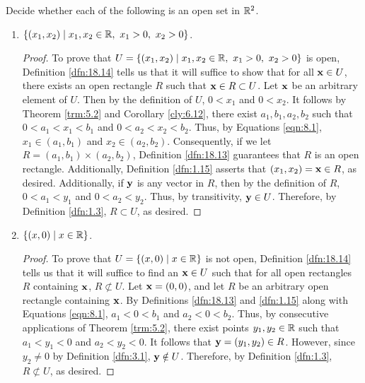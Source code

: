 \documentclass[../main.tex]{subfiles}
\begin{document}
\begin{exercise}\label{exr:18.15}
    Decide whether each of the following is an open set in $\mathbb{R}^2$.
    \begin{enumerate}[label={\textup{(}\alph*\textup{)}}]
        \item $\{(x_1,x_2)\mid x_1,x_2\in\R,\ x_1>0,\ x_2>0\}$.
        \begin{proof}
            To prove that $U=\{(x_1,x_2)\mid x_1,x_2\in\R,\ x_1>0,\ x_2>0\}$ is open, Definition \ref{dfn:18.14} tells us that it will suffice to show that for all $\mathbf{x}\in U$, there exists an open rectangle $R$ such that $\mathbf{x}\in R\subset U$. Let $\mathbf{x}$ be an arbitrary element of $U$. Then by the definition of $U$, $0<x_1$ and $0<x_2$. It follows by Theorem \ref{trm:5.2} and Corollary \ref{cly:6.12}, there exist $a_1,b_1,a_2,b_2$ such that $0<a_1<x_1<b_1$ and $0<a_2<x_2<b_2$. Thus, by Equations \ref{eqn:8.1}, $x_1\in(a_1,b_1)$ and $x_2\in(a_2,b_2)$. Consequently, if we let $R=(a_1,b_1)\times(a_2,b_2)$, Definition \ref{dfn:18.13} guarantees that $R$ is an open rectangle. Additionally, Definition \ref{dfn:1.15} asserts that $(x_1,x_2)=\mathbf{x}\in R$, as desired. Additionally, if $\mathbf{y}$ is any vector in $R$, then by the definition of $R$, $0<a_1<y_1$ and $0<a_2<y_2$. Thus, by transitivity, $\mathbf{y}\in U$. Therefore, by Definition \ref{dfn:1.3}, $R\subset U$, as desired.
        \end{proof}
        \item $\{(x,0)\mid x\in\mathbb{R}\}$.
        \begin{proof}
            To prove that $U=\{(x,0)\mid x\in\mathbb{R}\}$ is not open, Definition \ref{dfn:18.14} tells us that it will suffice to find an $\mathbf{x}\in U$ such that for all open rectangles $R$ containing $\mathbf{x}$, $R\not\subset U$. Let $\mathbf{x}=(0,0)$, and let $R$ be an arbitrary open rectangle containing $\mathbf{x}$. By Definitions \ref{dfn:18.13} and \ref{dfn:1.15} along with Equations \ref{eqn:8.1}, $a_1<0<b_1$ and $a_2<0<b_2$. Thus, by consecutive applications of Theorem \ref{trm:5.2}, there exist points $y_1,y_2\in\mathbb{R}$ such that $a_1<y_1<0$ and $a_2<y_2<0$. It follows that $\mathbf{y}=(y_1,y_2)\in R$. However, since $y_2\neq 0$ by Definition \ref{dfn:3.1}, $\mathbf{y}\notin U$. Therefore, by Definition \ref{dfn:1.3}, $R\not\subset U$, as desired.
        \end{proof}
    \end{enumerate}
\end{exercise}
\end{document}
